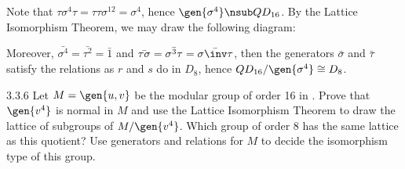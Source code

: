 \begin{sol}
    Note that $\tau\sigma^4\tau = \tau\tau\sigma^{12} = \sigma^4$, hence $\gen{\sigma^4} \nsub QD_{16}$.
	By the Lattice Isomorphism Theorem, we may draw the following diagram:
    \begin{center}
    \end{center}
    Moreover, $\bar{\sigma^4} = \bar{\tau^2} = \bar 1$ and $\bar{\tau\sigma} = \bar{\sigma^3\tau} = \bar{\sigma\inv\tau}$, then the generators $\bar\sigma$ and $\bar\tau$ satisfy the relations as $r$ and $s$ do in $D_8$, hence $QD_{16}/\gen{\sigma^4} \cong D_8$.
\end{sol}

\begin{exercise}{3.3.6}
    Let $M = \gen{u, v}$ be the modular group of order 16 in .
	Prove that $\gen{v^4}$ is normal in $M$ and use the Lattice Isomorphism Theorem to draw the lattice of subgroups of $M/\gen{v^4}$.
	Which group of order 8 has the same lattice as this quotient?
	Use generators and relations for $M$ to decide the isomorphism type of this group.
\end{exercise}

